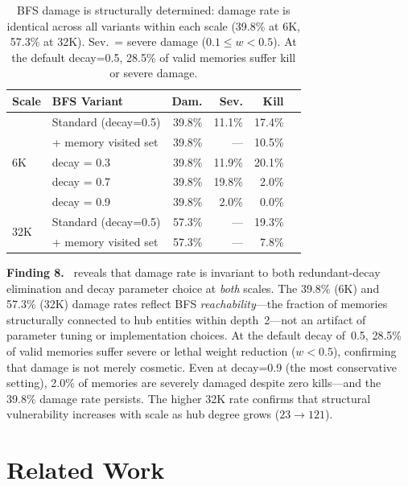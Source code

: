 \documentclass{article}
\newcommand{\finding}[1]{\vspace{2pt}\noindent\textbf{Finding #1.}~}
\begin{document}
\begin{table}[htbp]
\centering
\scriptsize
\begin{tabular}{llrrrr}
\toprule
\textbf{Scale} & \textbf{BFS Variant} & \textbf{Dam.} & \textbf{Sev.} & \textbf{Kill} \\
\midrule
\multirow{5}{*}{6K} & Standard (decay=0.5) & 39.8\% & 11.1\% & 17.4\% \\
& + memory visited set & 39.8\% & --- & 10.5\% \\
\cmidrule{2-5}
& decay = 0.3 & 39.8\% & 11.9\% & 20.1\% \\
& decay = 0.7 & 39.8\% & 19.8\% & 2.0\% \\
& decay = 0.9 & 39.8\% & 2.0\% & 0.0\% \\
\midrule
\multirow{2}{*}{32K} & Standard (decay=0.5) & 57.3\% & --- & 19.3\% \\
& + memory visited set & 57.3\% & --- & 7.8\% \\
\bottomrule
\end{tabular}
\caption{BFS damage is structurally determined: damage rate is identical across all variants within each scale (39.8\% at 6K, 57.3\% at 32K). Sev.\ = severe damage ($0.1 \leq w < 0.5$). At the default decay=0.5, 28.5\% of valid memories suffer kill or severe damage.}
\label{tab:robust}
\end{table}

\finding{8}  reveals that damage rate is invariant to both redundant-decay elimination and decay parameter choice at \textit{both} scales.
The 39.8\% (6K) and 57.3\% (32K) damage rates reflect BFS \textit{reachability}---the fraction of memories structurally connected to hub entities within depth~2---not an artifact of parameter tuning or implementation choices.
At the default decay of~0.5, 28.5\% of valid memories suffer severe or lethal weight reduction ($w < 0.5$), confirming that damage is not merely cosmetic.
Even at decay=0.9 (the most conservative setting), 2.0\% of memories are severely damaged despite zero kills---and the 39.8\% damage rate persists.
The higher 32K rate confirms that structural vulnerability increases with scale as hub degree grows ($23 \rightarrow 121$).


\section{Related Work}
\label{sec:related}
\end{document}
